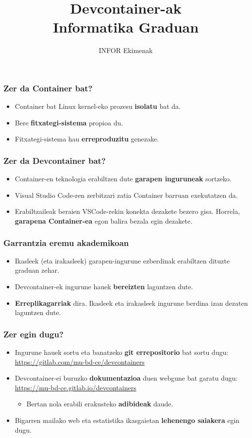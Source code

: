 \documentclass[lang=eu,biz=pls,aspectratio=169,handout]{mupresentation}
\title{Devcontainer-ak\\Informatika Graduan}
\subtitle{INFOR Ekimenak}
\institute{Mondragon Unibertsitatea}
\date{}
\begin{document}
\mucover

\begin{frame}
  \frametitle{Zer da Container bat?}
  \begin{itemize}
    \item Container bat Linux kernel-eko prozesu \textbf{isolatu} bat da.
    \item Bere \textbf{fitxategi-sistema} propioa du.
    \item Fitxategi-sistema hau \textbf{erreproduzitu} genezake.
  \end{itemize}
\end{frame}

\begin{frame}
  \frametitle{Zer da Devcontainer bat?}
  \begin{itemize}
    \item Container-en teknologia erabiltzen dute \textbf{garapen inguruneak} sortzeko.
    \item Visual Studio Code-ren zerbitzari zatia Container barruan exekutatzen da.
    \item Erabiltzaileak beraien VSCode-rekin konekta dezakete bezero gisa. Horrela, \textbf{garapena Container-ea} egon balira bezala egin dezakete.
  \end{itemize}
\end{frame}

\begin{frame}
  \frametitle{Garrantzia eremu akademikoan}
  \begin{itemize}
    \item Ikasleek (eta irakasleek) garapen-ingurune ezberdinak erabiltzen dituzte graduan zehar.
    \item Devcontainer-ek ingurune hauek \textbf{bereizten} laguntzen dute.
    \item \textbf{Erreplikagarriak} dira. Ikasleek eta irakasleek ingurune berdina izan dezaten laguntzen dute.
  \end{itemize}
\end{frame}

\begin{frame}
  \frametitle{Zer egin dugu?}
  \begin{itemize}
    \item Ingurune hauek sortu eta banatzeko \textbf{git errepositorio} bat sortu dugu: \url{https://gitlab.com/mu-bd-ce/devcontainers}
    \item Devcontainer-ei buruzko \textbf{dokumentazioa} duen webgune bat garatu dugu: \url{https://mu-bd-ce.gitlab.io/devcontainers}
      \begin{itemize}
        \item Bertan nola erabili erakusteko \textbf{adibideak} daude.
      \end{itemize}
    \item Bigarren mailako web eta estatistika ikasgaietan \textbf{lehenengo saiakera} egin dugu.
  \end{itemize}
\end{frame}
\end{document}
